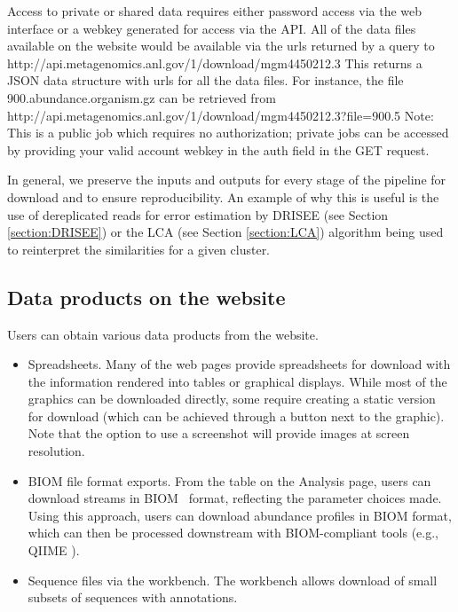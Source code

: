 \documentclass[12pt,fullpage]{report}
\begin{document}
Access to private or shared data requires either password access via the web interface or a webkey generated for access via the API.
All of the data files available on the website would be available via the urls returned by
a query to
http://api.metagenomics.anl.gov/1/download/mgm4450212.3
This returns a JSON data structure with urls for all the data files. For instance, the file
900.abundance.organism.gz
can be retrieved from
http://api.metagenomics.anl.gov/1/download/mgm4450212.3?file=900.5
Note: This is a public job which requires no authorization; private jobs can be accessed by providing your valid account webkey in the auth field in the GET request.

In general, we preserve the inputs and outputs for every stage of the pipeline for download and to ensure reproducibility.
An example of why this is useful is the use of dereplicated reads for error estimation by DRISEE (see Section \ref{section:DRISEE}) or the LCA (see Section \ref{section:LCA}) algorithm being used to reinterpret the similarities for a given cluster.
\subsection{Data products on the website}

Users can obtain 
various data products from the website.
\begin{itemize}
\item
Spreadsheets.
Many of the web pages provide spreadsheets for download with the information rendered into tables or
graphical displays.
While most of the graphics can be downloaded directly, some require creating a static version for download (which can be achieved through a button next to the graphic).
Note that the option to use a screenshot will provide images at screen resolution.
\item
BIOM file format exports.
From the table on the Analysis page, users can download streams in BIOM~\cite{BIOM} format, reflecting the parameter choices made.
Using this approach, users can download abundance profiles in BIOM format, which can then be processed downstream with BIOM-compliant tools (e.g., QIIME \cite{QIIME}).
\item
Sequence files via the workbench.
The workbench allows download of small subsets of sequences with annotations.
\end{itemize}
\end{document}
